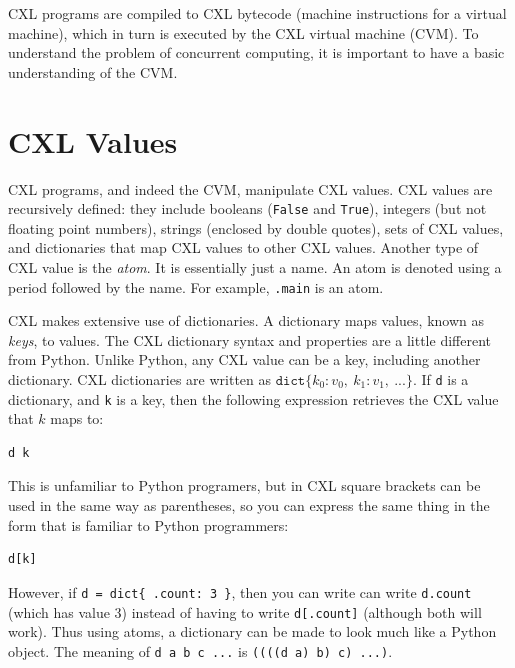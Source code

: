 \documentclass{report}
\newenvironment{code}{
\tcolorbox
}{
\endtcolorbox
}
\begin{document}
CXL programs are compiled to CXL bytecode
(machine instructions for a virtual machine),
which in turn is executed by the CXL virtual machine (CVM).
To understand the problem of concurrent computing, it
is important to have a basic understanding of the CVM.

\section*{CXL Values}
\label{ap:cxlvalues}

CXL programs, and indeed the CVM,  manipulate CXL values.
CXL values are recursively defined:
they include booleans (\texttt{False} and \texttt{True}),
integers (but not floating point numbers),
strings (enclosed by double quotes),
sets of CXL values,
and dictionaries
that map CXL values to other CXL values.
%
Another type of CXL value is the \emph{atom}.
It is essentially
just a name.  An atom is denoted using a period followed by the
name.  For example, \texttt{.main} is an atom.

CXL makes extensive use of dictionaries.
A dictionary maps values, known as \emph{keys}, to values.
The CXL dictionary syntax and properties are a little different from Python.
Unlike Python, any CXL value can be a key, including another
dictionary.
CXL dictionaries are written as
$\mathtt{dict}\{ k_0: v_0, ~ k_1: v_1, ~ ... \}$.
If \texttt{d} is a dictionary, and \texttt{k} is a key, then the
following expression retrieves the CXL value that $k$ maps to:
\begin{code}
\begin{verbatim}
d k
\end{verbatim}
\end{code}
This is unfamiliar to Python programers, but in CXL square brackets can be used
in the same way as parentheses, so you can express the same thing in the form
that is familiar to Python programmers:
\begin{code}
\begin{verbatim}
d[k]
\end{verbatim}
\end{code}
However, if \texttt{d = dict\{ .count: 3 \}}, then you can write
can write \texttt{d.count} (which has value 3) instead of having to write
\texttt{d[.count]} (although both will work).
Thus using atoms, a dictionary can be made to look much like a Python object.
The meaning of \texttt{d a b c ...} is \texttt{((((d a) b) c) ...)}.
\end{document}
